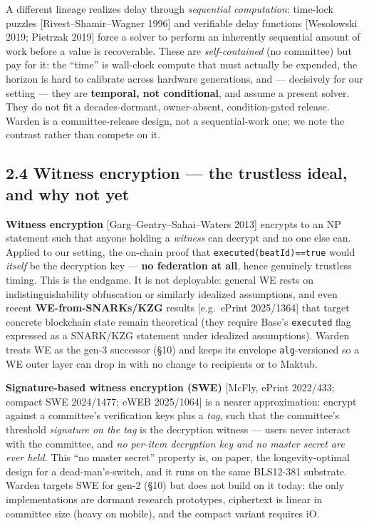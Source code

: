 \documentclass[
  11pt,
]{article}
\begin{document}
A different lineage realizes delay through \emph{sequential
computation}: time-lock puzzles {[}Rivest--Shamir--Wagner 1996{]} and
verifiable delay functions {[}Wesolowski 2019; Pietrzak 2019{]} force a
solver to perform an inherently sequential amount of work before a value
is recoverable. These are \emph{self-contained} (no committee) but pay
for it: the ``time'' is wall-clock compute that must actually be
expended, the horizon is hard to calibrate across hardware generations,
and --- decisively for our setting --- they are \textbf{temporal, not
conditional}, and assume a present solver. They do not fit a
decades-dormant, owner-absent, condition-gated release. Warden is a
committee-release design, not a sequential-work one; we note the
contrast rather than compete on it.

\subsection{2.4 Witness encryption --- the trustless ideal, and why not
yet}\label{witness-encryption-the-trustless-ideal-and-why-not-yet}

\textbf{Witness encryption} {[}Garg--Gentry--Sahai--Waters 2013{]}
encrypts to an NP statement such that anyone holding a \emph{witness}
can decrypt and no one else can. Applied to our setting, the on-chain
proof that \texttt{executed(beatId)==true} would \emph{itself} be the
decryption key --- \textbf{no federation at all}, hence genuinely
trustless timing. This is the endgame. It is not deployable: general WE
rests on indistinguishability obfuscation or similarly idealized
assumptions, and even recent \textbf{WE-from-SNARKs/KZG} results
{[}e.g.~ePrint 2025/1364{]} that target concrete blockchain state remain
theoretical (they require Base's \texttt{executed} flag expressed as a
SNARK/KZG statement under idealized assumptions). Warden treats WE as
the gen-3 successor (§10) and keeps its envelope \texttt{alg}-versioned
so a WE outer layer can drop in with no change to recipients or to
Maktub.

\textbf{Signature-based witness encryption (SWE)} {[}McFly, ePrint
2022/433; compact SWE 2024/1477; eWEB 2025/1064{]} is a nearer
approximation: encrypt against a committee's verification keys plus a
\emph{tag}, such that the committee's threshold \emph{signature on the
tag} is the decryption witness --- users never interact with the
committee, and \emph{no per-item decryption key and no master secret are
ever held.} This ``no master secret'' property is, on paper, the
longevity-optimal design for a dead-man's-switch, and it runs on the
same BLS12-381 substrate. Warden targets SWE for gen-2 (§10) but does
not build on it today: the only implementations are dormant research
prototypes, ciphertext is linear in committee size (heavy on mobile),
and the compact variant requires iO.
\end{document}
